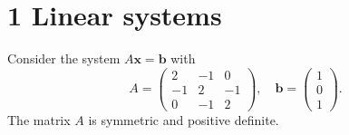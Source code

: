 \documentclass{article}
\begin{document}
\section*{1 Linear systems}

Consider the system $A\mathbf{x} = \mathbf{b}$ with
\[
A = \begin{pmatrix} 2 & -1 & 0 \\ -1 & 2 & -1 \\ 0 & -1 & 2 \end{pmatrix}, \quad \mathbf{b} = \begin{pmatrix} 1 \\ 0 \\ 1 \end{pmatrix}.
\]
The matrix $A$ is symmetric and positive definite.
\end{document}
